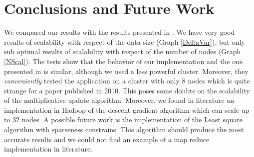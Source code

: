 \section{Conclusions and Future Work}
\label{conclusion}
%
%
%
%
%

We compared our results with the results presented in \cite{liu2010}.
We have very good results of scalability with respect of the data size (Graph \ref{DeltaVar}), but only sub optimal results of scalability with respect of the number of nodes (Graph \ref{NScal}).
The tests show that the behavior of our implementation and the one presented in \citep{liu2010} is similar, although we used a less powerful cluster. 
Moreover, they \textit{conveniently} tested the application on a cluster with only 8 nodes which is quite strange for a paper published in 2010.
This poses some doubts on the scalability of the multiplicative update algorithm.
Moreover, we found in literature an implementation in Hadoop of the descent gradient algorithm\cite{IBM_NMF} which can scale up to 32 nodes.
A possible future work is the implementation of the Least square algorithm with sparseness constrains.
This algorithm should produce the most accurate results and we could not find an example of a map reduce implementation in literature.


